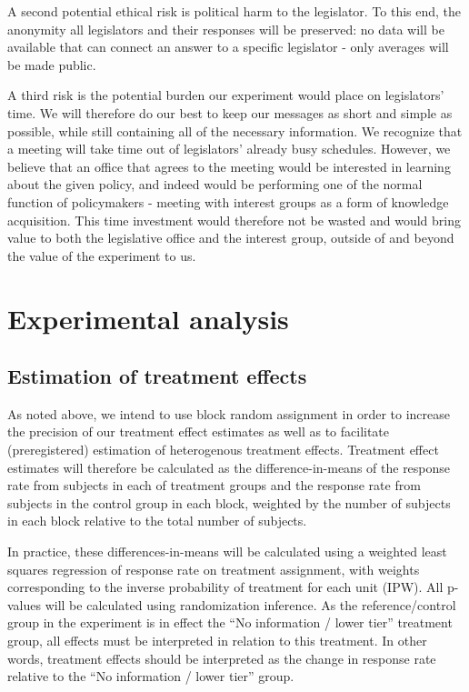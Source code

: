 \documentclass[12pt,final,fleqn]{article}
\theoremstyle{plain}
\begin{document}
A second potential ethical risk is political harm to the legislator. To this end, the anonymity all legislators and their responses will be preserved: no data will be available that can connect an answer to a specific legislator - only averages will be made public.

A third risk is the potential burden our experiment would place on legislators' time. We will therefore do our best to keep our messages as short and simple as possible, while still containing all of the necessary information. We recognize that a meeting will take time out of legislators' already busy schedules. However, we believe that an office that agrees to the meeting would be interested in learning about the given policy, and indeed would be  performing one of the normal function of policymakers - meeting with interest groups as a form of knowledge acquisition. This time investment would therefore not be wasted and would bring value to both the legislative office and the interest group, outside of and beyond the value of the experiment to us. 

\section{Experimental analysis} \label{sec:analysis}

\subsection{Estimation of treatment effects} \label{sec:treatment_effects}

As noted above, we intend to use block random assignment in order  to increase the precision of our treatment effect estimates as well as to facilitate (preregistered) estimation of heterogenous treatment effects. Treatment effect estimates will therefore be calculated as the difference-in-means of the response rate from subjects in each of treatment groups and the response rate from subjects in the control group in each block, weighted by the number of subjects in each block relative to the total number of subjects.

In practice, these differences-in-means will be calculated using a weighted least squares regression of response rate on treatment assignment, with weights corresponding to the inverse probability of treatment for each unit (IPW). All p-values will be calculated using randomization inference. As the reference/control group in the experiment is in effect the ``No information / lower tier'' treatment group, all effects must be interpreted in relation to this treatment. In other words, treatment effects should be interpreted as the change in response rate relative to the ``No information / lower tier'' group.
\end{document}
